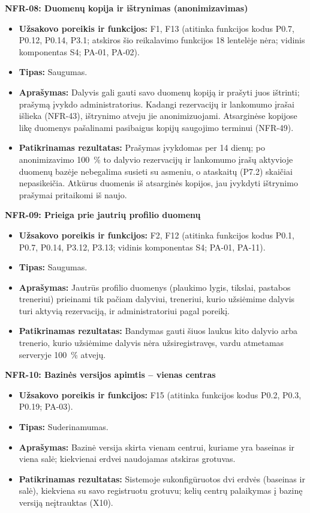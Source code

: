 \noindent\textbf{NFR-08: Duomenų kopija ir ištrynimas (anonimizavimas)}
\begin{itemize}
    \item \textbf{Užsakovo poreikis ir funkcijos:} F1, F13 (atitinka funkcijos kodus P0.7, P0.12, P0.14, P3.1; atskiros šio reikalavimo funkcijos 18 lentelėje nėra; vidinis komponentas S4; PA-01, PA-02).
    \item \textbf{Tipas:} Saugumas.
    \item \textbf{Aprašymas:} Dalyvis gali gauti savo duomenų kopiją ir prašyti juos ištrinti; prašymą įvykdo administratorius. Kadangi rezervacijų ir lankomumo įrašai išlieka (NFR-43), ištrynimo atveju jie anonimizuojami. Atsarginėse kopijose likę duomenys pašalinami pasibaigus kopijų saugojimo terminui (NFR-49).
    \item \textbf{Patikrinamas rezultatas:} Prašymas įvykdomas per 14 dienų; po anonimizavimo 100~\% to dalyvio rezervacijų ir lankomumo įrašų aktyvioje duomenų bazėje nebegalima susieti su asmeniu, o ataskaitų (P7.2) skaičiai nepasikeičia. Atkūrus duomenis iš atsarginės kopijos, jau įvykdyti ištrynimo prašymai pritaikomi iš naujo.
\end{itemize}


\noindent\textbf{NFR-09: Prieiga prie jautrių profilio duomenų}
\begin{itemize}
    \item \textbf{Užsakovo poreikis ir funkcijos:} F2, F12 (atitinka funkcijos kodus P0.1, P0.7, P0.14, P3.12, P3.13; vidinis komponentas S4; PA-01, PA-11).
    \item \textbf{Tipas:} Saugumas.
    \item \textbf{Aprašymas:} Jautrūs profilio duomenys (plaukimo lygis, tikslai, pastabos treneriui) prieinami tik pačiam dalyviui, treneriui, kurio užsiėmime dalyvis turi aktyvią rezervaciją, ir administratoriui pagal poreikį.
    \item \textbf{Patikrinamas rezultatas:} Bandymas gauti šiuos laukus kito dalyvio arba trenerio, kurio užsiėmime dalyvis nėra užsiregistravęs, vardu atmetamas serveryje 100~\% atvejų.
\end{itemize}

\noindent\textbf{NFR-10: Bazinės versijos apimtis -- vienas centras}
\begin{itemize}
    \item \textbf{Užsakovo poreikis ir funkcijos:} F15 (atitinka funkcijos kodus P0.2, P0.3, P0.19; PA-03).
    \item \textbf{Tipas:} Suderinamumas.
    \item \textbf{Aprašymas:} Bazinė versija skirta vienam centrui, kuriame yra baseinas ir viena salė; kiekvienai erdvei naudojamas atskiras grotuvas.
    \item \textbf{Patikrinamas rezultatas:} Sistemoje sukonfigūruotos dvi erdvės (baseinas ir salė), kiekviena su savo registruotu grotuvu; kelių centrų palaikymas į bazinę versiją neįtrauktas (X10).
\end{itemize}

